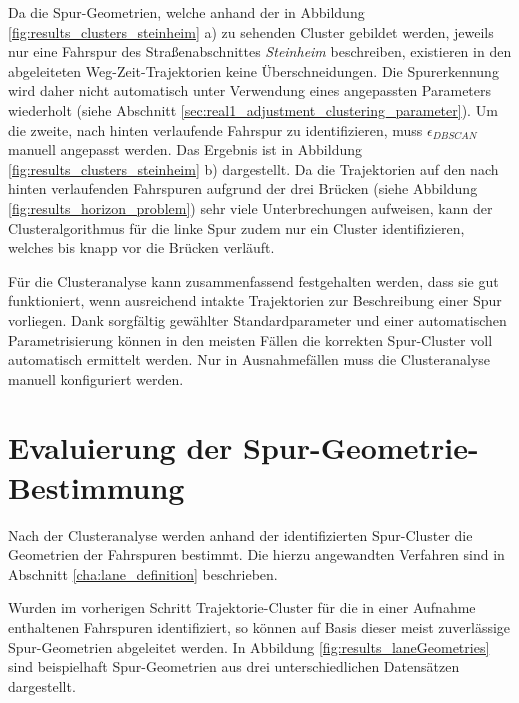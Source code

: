 Da die Spur-Geometrien, welche anhand der in Abbildung \ref{fig:results_clusters_steinheim} a) zu sehenden
Cluster gebildet werden, jeweils nur eine Fahrspur des Straßenabschnittes \textit{Steinheim} beschreiben,
existieren in den abgeleiteten Weg-Zeit-Trajektorien keine Überschneidungen. Die Spurerkennung wird daher
nicht automatisch unter Verwendung eines angepassten Parameters wiederholt (siehe Abschnitt \ref{sec:real1_adjustment_clustering_parameter}).
Um die zweite, nach hinten verlaufende Fahrspur zu identifizieren, muss $\epsilon_{DBSCAN}$ manuell angepasst werden.
Das Ergebnis ist in Abbildung \ref{fig:results_clusters_steinheim} b) dargestellt.
Da die Trajektorien auf den nach hinten verlaufenden Fahrspuren aufgrund der drei Brücken
(siehe Abbildung \ref{fig:results_horizon_problem}) sehr viele Unterbrechungen
aufweisen, kann der Clusteralgorithmus für die linke Spur zudem nur ein Cluster identifizieren, welches bis
knapp vor die Brücken verläuft.

Für die Clusteranalyse kann zusammenfassend festgehalten werden, dass sie gut funktioniert, wenn ausreichend
intakte Trajektorien zur Beschreibung einer Spur vorliegen. Dank sorgfältig gewählter Standardparameter
und einer automatischen Parametrisierung können in den meisten Fällen die korrekten Spur-Cluster voll automatisch
ermittelt werden. Nur in Ausnahmefällen muss die Clusteranalyse manuell konfiguriert werden.

\section{Evaluierung der Spur-Geometrie-Bestimmung}

Nach der Clusteranalyse werden anhand der identifizierten Spur-Cluster die Geometrien der Fahrspuren
bestimmt. Die hierzu angewandten Verfahren sind in Abschnitt \ref{cha:lane_definition} beschrieben.

Wurden im vorherigen Schritt Trajektorie-Cluster für die in einer Aufnahme enthaltenen Fahrspuren identifiziert,
so können auf Basis dieser meist zuverlässige Spur-Geometrien abgeleitet werden.
In Abbildung \ref{fig:results_laneGeometries} sind beispielhaft Spur-Geometrien aus drei unterschiedlichen Datensätzen dargestellt.

